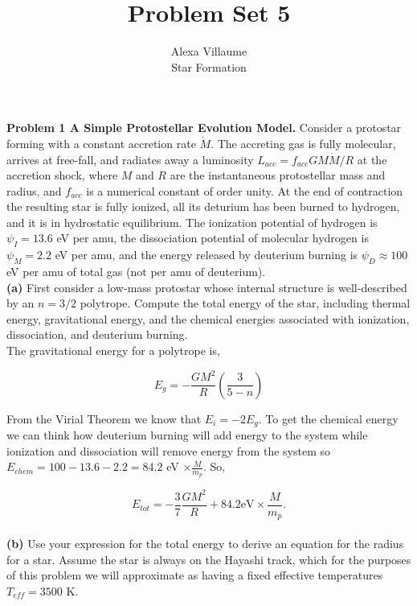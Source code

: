 \documentclass[12pt]{article}
\begin{document}
 
 \title{Problem Set 5}
\author{Alexa Villaume\\ 
Star Formation} 
 
\maketitle
 
\noindent \textbf{Problem 1 A Simple Protostellar Evolution Model.} Consider a protostar forming with a constant accretion rate $\dot{M}$. The accreting gas is fully molecular, arrives at free-fall, and radiates away a luminosity $L_{acc} = f_{acc}GM\dot{M}/R$ at the accretion shock, where $M$ and $R$ are the instantaneous protostellar mass and radius, and $f_{acc}$ is a numerical constant of order unity. At the end of contraction the resulting star is fully ionized, all its deturium has been burned to hydrogen, and it is in hydrostatic equilibrium. The ionization potential of hydrogen is $\psi_I = 13.6$ eV per amu, the dissociation potential of molecular hydrogen is $\psi_M = 2.2$ eV per amu, and the energy released by deuterium burning is $\psi_D \approx 100$ eV per amu of total gas (not per amu of deuterium). \\

\noindent \textbf{(a)}  First consider a low-mass protostar whose internal structure is well-described by an $n = 3/2$ polytrope. Compute the total energy of the star, including thermal energy, gravitational energy, and the chemical energies associated with ionization, dissociation, and deuterium burning.\\

\noindent The gravitational energy for a polytrope is,

\begin{equation}
E_g = -\frac{GM^2}{R}\left ( \frac{3}{5-n}\right)
\end{equation}

\noindent From the Virial Theorem we know that $E_{i} = -2E_g$. To get the chemical energy we can think how deuterium burning will add energy to the system while ionization and dissociation will remove energy from the system so $E_{chem} = 100 - 13.6 - 2.2 = 84.2$ eV  $\times \frac{M}{m_p}$. So,

\begin{equation}
E_{tot} = -\frac{3}{7}\frac{GM^2}{R} + 84.2\mathrm{eV} \times \frac{M}{m_p}.
\end{equation}\\

\noindent \textbf{(b)} Use your expression for the total energy to derive an equation for the radius for a star. Assume the star is always on the Hayashi track, which for the purposes of this problem we will approximate as having a fixed effective temperatures $T_{eff} = 3500$ K. \\
\end{document}
